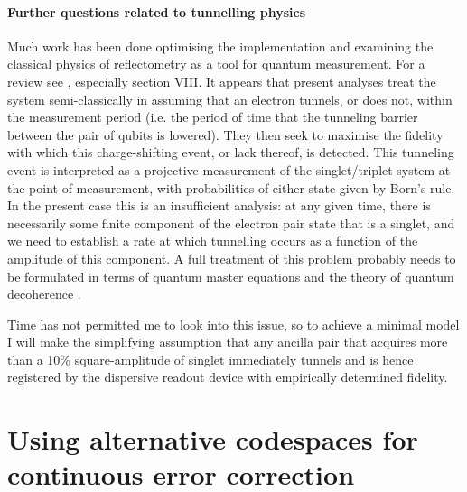 \documentclass{report}
\begin{document}
\begin{appendices}
\subsubsection{Further questions related to tunnelling physics} \label{sec:tunneling_question}

Much work has been done optimising the implementation and examining the classical physics of reflectometry as a tool for quantum measurement. For a review see \cite{Vigneau2023}, especially section VIII. It appears that present analyses treat the system semi-classically in assuming that an electron tunnels, or does not, within the measurement period (i.e. the period of time that the tunneling barrier between the pair of qubits is lowered). They then seek to maximise the fidelity with which this charge-shifting event, or lack thereof, is detected. This tunneling event is interpreted as a projective measurement of the singlet/triplet system at the point of measurement, with probabilities of either state given by Born's rule. In the present case this is an insufficient analysis: at any given time, there is necessarily some finite component of the electron pair state that is a singlet, and we need to establish a rate at which tunnelling occurs as a function of the amplitude of this component. A full treatment of this problem probably needs to be formulated in terms of quantum master equations and the theory of quantum decoherence \cite{Wiseman1996}.

Time has not permitted me to look into this issue, so to achieve a minimal model I will make the simplifying assumption that any ancilla pair that acquires more than a 10\% square-amplitude of singlet immediately tunnels and is hence registered by the dispersive readout device with empirically determined fidelity.

\chapter{Using alternative codespaces for continuous error correction}\label{appendix:evenparitycodespace}


\end{appendices}
\end{document}

